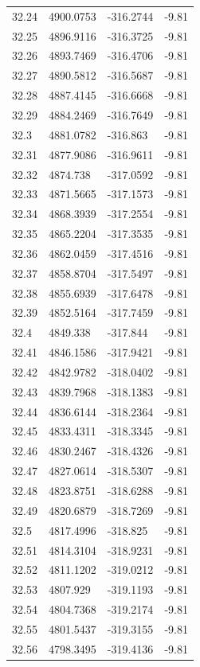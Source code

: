 \begin{table}[H]
\begin{tabular}{llll}
32.24 & 4900.0753 & -316.2744 & -9.81 \\
32.25 & 4896.9116 & -316.3725 & -9.81 \\
32.26 & 4893.7469 & -316.4706 & -9.81 \\
32.27 & 4890.5812 & -316.5687 & -9.81 \\
32.28 & 4887.4145 & -316.6668 & -9.81 \\
32.29 & 4884.2469 & -316.7649 & -9.81 \\
32.3 & 4881.0782 & -316.863 & -9.81 \\
32.31 & 4877.9086 & -316.9611 & -9.81 \\
32.32 & 4874.738 & -317.0592 & -9.81 \\
32.33 & 4871.5665 & -317.1573 & -9.81 \\
32.34 & 4868.3939 & -317.2554 & -9.81 \\
32.35 & 4865.2204 & -317.3535 & -9.81 \\
32.36 & 4862.0459 & -317.4516 & -9.81 \\
32.37 & 4858.8704 & -317.5497 & -9.81 \\
32.38 & 4855.6939 & -317.6478 & -9.81 \\
32.39 & 4852.5164 & -317.7459 & -9.81 \\
32.4 & 4849.338 & -317.844 & -9.81 \\
32.41 & 4846.1586 & -317.9421 & -9.81 \\
32.42 & 4842.9782 & -318.0402 & -9.81 \\
32.43 & 4839.7968 & -318.1383 & -9.81 \\
32.44 & 4836.6144 & -318.2364 & -9.81 \\
32.45 & 4833.4311 & -318.3345 & -9.81 \\
32.46 & 4830.2467 & -318.4326 & -9.81 \\
32.47 & 4827.0614 & -318.5307 & -9.81 \\
32.48 & 4823.8751 & -318.6288 & -9.81 \\
32.49 & 4820.6879 & -318.7269 & -9.81 \\
32.5 & 4817.4996 & -318.825 & -9.81 \\
32.51 & 4814.3104 & -318.9231 & -9.81 \\
32.52 & 4811.1202 & -319.0212 & -9.81 \\
32.53 & 4807.929 & -319.1193 & -9.81 \\
32.54 & 4804.7368 & -319.2174 & -9.81 \\
32.55 & 4801.5437 & -319.3155 & -9.81 \\
32.56 & 4798.3495 & -319.4136 & -9.81 \\

\end{tabular}
\end{table}
